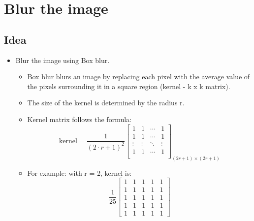 \chapter{Blur the image}

\section{Idea}
\begin{itemize}
    \item Blur the image using Box blur.
    \begin{itemize}[label=$\circ$]
        \item Box blur \cite{box_blur} blurs an image by replacing each pixel with the average value of the pixels surrounding it in a square region (kernel - k x k matrix). 
        \item The size of the kernel is determined by the radius r.
        \item Kernel matrix follows the formula:
        \[
        \text{kernel} = \frac{1}{(2 \cdot r + 1)^2}
        \begin{bmatrix}
        1 & 1 & \cdots & 1 \\
        1 & 1 & \cdots & 1 \\
        \vdots & \vdots & \ddots & \vdots \\
        1 & 1 & \cdots & 1 \\
        \end{bmatrix}_{(2r + 1) \times (2r + 1)}
        \]
        \item For example: with r = 2, kernel is:
        \[
        \frac{1}{25} \begin{bmatrix}
            1 & 1 & 1 & 1 & 1 \\
            1 & 1 & 1 & 1 & 1 \\
            1 & 1 & 1 & 1 & 1 \\
            1 & 1 & 1 & 1 & 1 \\
            1 & 1 & 1 & 1 & 1
        \end{bmatrix}
        \]
    \end{itemize}
\end{itemize}

